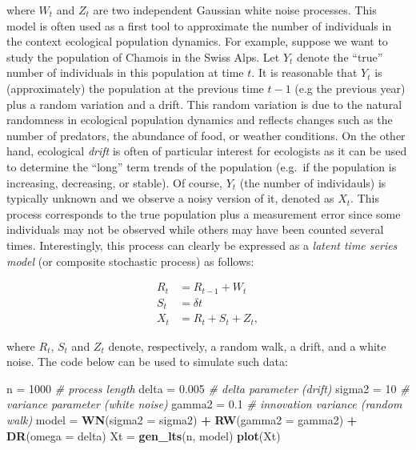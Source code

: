 \documentclass[]{book}
\newenvironment{Shaded}{\begin{snugshade}}{\end{snugshade}}
\newcommand{\CommentTok}[1]{\textcolor[rgb]{0.56,0.35,0.01}{\textit{#1}}}
\newcommand{\DataTypeTok}[1]{\textcolor[rgb]{0.13,0.29,0.53}{#1}}
\newcommand{\DecValTok}[1]{\textcolor[rgb]{0.00,0.00,0.81}{#1}}
\newcommand{\FloatTok}[1]{\textcolor[rgb]{0.00,0.00,0.81}{#1}}
\newcommand{\KeywordTok}[1]{\textcolor[rgb]{0.13,0.29,0.53}{\textbf{#1}}}
\newcommand{\NormalTok}[1]{#1}
\newcommand{\OperatorTok}[1]{\textcolor[rgb]{0.81,0.36,0.00}{\textbf{#1}}}
\newcommand{\StringTok}[1]{\textcolor[rgb]{0.31,0.60,0.02}{#1}}
\theoremstyle{definition}
\theoremstyle{definition}
\theoremstyle{definition}
\theoremstyle{remark}
\begin{document}
where \(W_t\) and \(Z_t\) are two independent Gaussian white noise
processes. This model is often used as a first tool to approximate the
number of individuals in the context ecological population dynamics. For
example, suppose we want to study the population of Chamois in the Swiss
Alps. Let \(Y_t\) denote the ``true'' number of individuals in this
population at time \(t\). It is reasonable that \(Y_t\) is
(approximately) the population at the previous time \(t-1\) (e.g the
previous year) plus a random variation and a drift. This random
variation is due to the natural randomness in ecological population
dynamics and reflects changes such as the number of predators, the
abundance of food, or weather conditions. On the other hand, ecological
\emph{drift} is often of particular interest for ecologists as it can be
used to determine the ``long'' term trends of the population (e.g.~if
the population is increasing, decreasing, or stable). Of course, \(Y_t\)
(the number of individauls) is typically unknown and we observe a noisy
version of it, denoted as \(X_t\). This process corresponds to the true
population plus a measurement error since some individuals may not be
observed while others may have been counted several times.
Interestingly, this process can clearly be expressed as a \emph{latent
time series model} (or composite stochastic process) as follows:

\[\begin{aligned}
R_t &= R_{t-1} + W_t \\
S_t &= \delta t \\
X_t &= R_t + S_t + Z_t,
\end{aligned}\]

where \(R_t\), \(S_t\) and \(Z_t\) denote, respectively, a random walk,
a drift, and a white noise. The code below can be used to simulate such
data:

\begin{Shaded}
\begin{Highlighting}[]
\NormalTok{n =}\StringTok{ }\DecValTok{1000}                                \CommentTok{# process length}
\NormalTok{delta =}\StringTok{ }\FloatTok{0.005}                           \CommentTok{# delta parameter (drift)}
\NormalTok{sigma2 =}\StringTok{ }\DecValTok{10}                             \CommentTok{# variance parameter (white noise)}
\NormalTok{gamma2 =}\StringTok{ }\FloatTok{0.1}                            \CommentTok{# innovation variance (random walk)}
\NormalTok{model =}\StringTok{ }\KeywordTok{WN}\NormalTok{(}\DataTypeTok{sigma2 =}\NormalTok{ sigma2) }\OperatorTok{+}\StringTok{ }\KeywordTok{RW}\NormalTok{(}\DataTypeTok{gamma2 =}\NormalTok{ gamma2) }\OperatorTok{+}\StringTok{ }\KeywordTok{DR}\NormalTok{(}\DataTypeTok{omega =}\NormalTok{ delta)}
\NormalTok{Xt =}\StringTok{ }\KeywordTok{gen_lts}\NormalTok{(n, model)}
\KeywordTok{plot}\NormalTok{(Xt)}
\end{Highlighting}
\end{Shaded}
\end{document}
